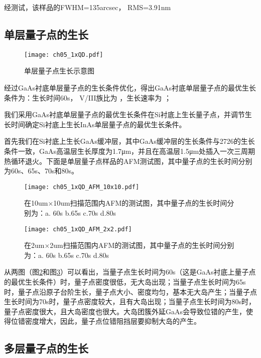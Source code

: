 经测试，该样品的FWHM=135arcsec， RMS=3.91nm

\subsection{单层量子点的生长}

\begin{figure}[ht]
	\centering
	\texttt{[image: ch05\_1xQD.pdf]}
	\caption{单层量子点生长示意图}
	\label{fig:1xQD}
\end{figure}

经过GaAs衬底单层量子点的生长条件优化，得出GaAs衬底单层量子点的最优生长条件为：生长时间60s， V/III族比为     ，生长速率为       ；

我们采用GaAs衬底单层量子点的最优生长条件在Si衬底上生长量子点，并调节生长时间确定Si衬底上生长InAs单层量子点的最优生长条件。

首先我们在Si衬底上生长GaAs缓冲层，其中GaAs缓冲层的生长条件与2726的生长条件一致，GaAs高温层生长厚度为1.7μm，并且在高温层1.5μm处插入一次三周期热循环退火。下面是单层量子点样品的AFM测试图，其中量子点的生长时间分别为60s、65s、70s和80s。

\begin{figure}[ht]
	\centering
	\texttt{[image: ch05\_1xQD\_AFM\_10x10.pdf]}
	\caption{在10um×10um扫描范围内AFM的测试图，其中量子点的生长时间分别为：a. 60s b.65s c.70s d.80s}
	\label{fig:1xQD_AFM_10x10}
\end{figure}

\begin{figure}[ht]
	\centering
	\texttt{[image: ch05\_1xQD\_AFM\_2x2.pdf]}
	\caption{在2um×2um扫描范围内AFM的测试图，其中量子点的生长时间分别为：a. 60s b.65s c.70s d.80s}
	\label{fig:1xQD_AFM_2x2}
\end{figure}

从两图（图\ref{fig:1xQD_AFM_10x10}和图\ref{fig:1xQD_AFM_2x2}）可以看出，当量子点生长时间为60s（这是GaAs衬底上量子点的最优生长条件）时，量子点密度很低，无大岛出现；当量子点生长时间为65s时，量子点沿原子台阶生长，量子点大小、密度均匀，基本无大岛产生；当量子点生长时间为70s时，量子点密度较大，且有大岛出现；当量子点生长时间为80s时，量子点密度很大，且大岛密度也很大。大岛团簇外延GaAs会导致位错的产生，使得位错密度增大，因此，量子点位错阻挡层要抑制大岛的产生。

\subsection{多层量子点的生长}


